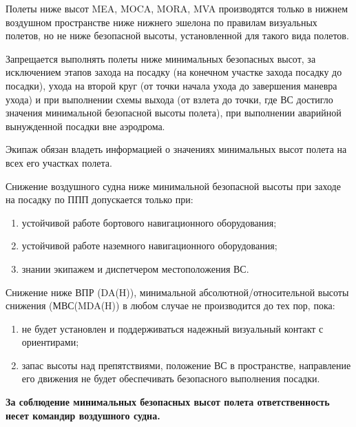 \begin{appendix}
Полеты ниже высот MEA, MOCA, MORA, MVA производятся только в нижнем воздушном пространстве ниже нижнего эшелона по правилам визуальных полетов, но не ниже безопасной высоты, установленной для такого вида полетов.


Запрещается выполнять полеты ниже минимальных безопасных высот, за исключением этапов захода на посадку (на конечном участке захода посадку до посадки), ухода на второй круг (от точки начала ухода до завершения маневра ухода) и при выполнении схемы выхода (от взлета до точки, где ВС достигло значения минимальной безопасной высоты полета), при выполнении аварийной вынужденной посадки вне аэродрома.

Экипаж обязан владеть информацией о значениях минимальных высот полета на всех его участках полета.


 Снижение воздушного судна ниже минимальной безопасной высоты при заходе на посадку по ППП допускается только при:
\begin{enumerate}[label=\alph*), ref=\alph*]
    \item  устойчивой работе бортового навигационного оборудования;
    \item  устойчивой работе наземного навигационного оборудования;
    \item  знании экипажем и диспетчером местоположения ВС.       
\end{enumerate}


Снижение ниже ВПР (DA(H)), минимальной абсолютной/относительной высоты снижения (МВС(MDA(H)) в любом случае не производится до тех пор, пока: 
\begin{enumerate}[label=\alph*), ref=\alph*]
    \item  не будет установлен и поддерживаться надежный визуальный контакт с ориентирами;
    \item  запас высоты над препятствиями, положение ВС в пространстве, направление его движения не будет обеспечивать безопасного выполнения посадки.       
\end{enumerate}
	
\textbf{За соблюдение минимальных безопасных высот полета ответственность несет командир воздушного судна.}




\end{appendix}
